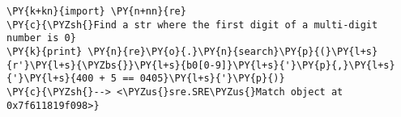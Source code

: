 \begin{Verbatim}[commandchars=\\\{\}]
\PY{k+kn}{import} \PY{n+nn}{re}
\PY{c}{\PYZsh{}Find a str where the first digit of a multi-digit number is 0}
\PY{k}{print} \PY{n}{re}\PY{o}{.}\PY{n}{search}\PY{p}{(}\PY{l+s}{r'}\PY{l+s}{\PYZbs{}}\PY{l+s}{b0[0-9]}\PY{l+s}{'}\PY{p}{,}\PY{l+s}{'}\PY{l+s}{400 + 5 == 0405}\PY{l+s}{'}\PY{p}{)}
\PY{c}{\PYZsh{}--> <\PYZus{}sre.SRE\PYZus{}Match object at 0x7f611819f098>}
\end{Verbatim}
